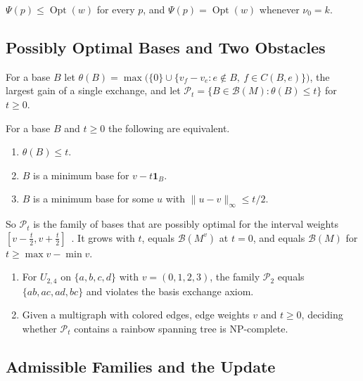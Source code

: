 \documentclass[runningheads,envcountsame]{llncs}
\newcommand{\Opt}{\operatorname{Opt}}
\newcommand{\Bases}{\mathcal B}
\newcommand{\Pos}{\mathcal P}
\begin{document}
\begin{lemma}
\label{lem:duality}
$\Psi(p)\le\Opt(w)$ for every $p$, and $\Psi(p)=\Opt(w)$ whenever $\nu_0=k$.
\end{lemma}

\subsection{Possibly Optimal Bases and Two Obstacles}
\label{sec:pos}

\begin{definition}
\label{def:theta}
For a base $B$ let
$\theta(B)=\max\bigl(\{0\}\cup\{v_f-v_e:e\notin B,\ f\in C(B,e)\}\bigr)$, the
largest gain of a single exchange, and let
$\Pos_t=\{B\in\Bases(M):\theta(B)\le t\}$ for $t\ge0$.
\end{definition}

\begin{proposition}
\label{prop:pos}
For a base $B$ and $t\ge0$ the following are equivalent.
\begin{enumerate}
  \item $\theta(B)\le t$.
  \item $B$ is a minimum base for $v-t\mathbf 1_B$.
  \item $B$ is a minimum base for some $u$ with $\|u-v\|_\infty\le t/2$.
\end{enumerate}
\end{proposition}

So $\Pos_t$ is the family of bases that are possibly optimal for the interval
weights $[v-\tfrac t2,v+\tfrac t2]$~\cite{kasperski08}.  It grows with $t$,
equals $\Bases(M^{v})$ at $t=0$, and equals $\Bases(M)$ for
$t\ge\max v-\min v$.

\begin{proposition}
\label{prop:obstacles}
\begin{enumerate}
  \item For $U_{2,4}$ on $\{a,b,c,d\}$ with $v=(0,1,2,3)$, the family $\Pos_2$
        equals $\{ab,ac,ad,bc\}$ and violates the basis exchange axiom.
  \item Given a multigraph with colored edges, edge weights $v$ and $t\ge0$,
        deciding whether $\Pos_t$ contains a rainbow spanning tree is
        NP-complete.
\end{enumerate}
\end{proposition}

\subsection{Admissible Families and the Update}
\label{sec:enlarge}
\end{document}
